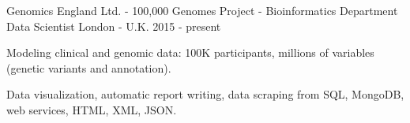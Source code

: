 


\begin{cventries}




\cventry
{Genomics England Ltd. - 100,000 Genomes Project - Bioinformatics Department} %
{Data Scientist} %
{London - U.K.} %
{2015 - present} %
{ %
\begin{cvitems}
\item {Modeling clinical and genomic data: 100K participants, millions of variables (genetic variants and annotation).}
\item {Data visualization, automatic report writing, data scraping from SQL, MongoDB, web services, HTML, XML, JSON.}
\end{cvitems}
}



\end{cventries}
